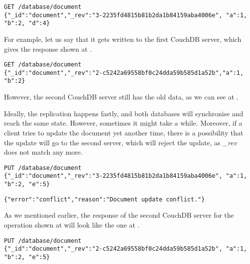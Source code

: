 \begin{lstlisting}[caption={The result of requesting the \textit{document} from CouchDB-1.}, label={lst:rwork5}]
GET /database/document
{"_id":"document","_rev":"3-2235fd4815b81b2da1b84159aba4006e", "a":1, "b":2, "d":4}
\end{lstlisting}

For example, let us say that it gets written to the first CouchDB server, which gives the response shown at .

\begin{lstlisting}[caption={The result of requesting the \textit{document} from CouchDB-2.}, label={lst:rwork6}]
GET /database/document
{"_id":"document","_rev":"2-c5242a69558bf0c24dda59b585d1a52b","a":1, "b":2}
\end{lstlisting}

However, the second CouchDB server still has the old data, as we can see at .

Ideally, the replication happens fastly, and both databases will synchronise and reach the same state. However, sometimes it might take a while. Moreover, if a client tries to update the document yet another time, there is a possibility that the update will go to the second server, which will reject the update, as \textit{\_rev} does not match any more. 

\begin{lstlisting}[caption={Updating the value of item \textit{document} by adding element \textit{e} and removing previously added element \textit{d}}, label={lst:rwork7}]
PUT /database/document
{"_id":"document","_rev":"3-2235fd4815b81b2da1b84159aba4006e", "a":1, "b":2, "e":5}
\end{lstlisting}

\begin{lstlisting}[caption={The demonstration of a conflict situation happening, when the \textit{\_rev} of sent operation and the one at the server do not match.}, label={lst:rwork8}]
{"error":"conflict","reason":"Document update conflict."}
\end{lstlisting}

As we mentioned earlier, the response of the second CouchDB server for the operation shown at  will look like the one at .

\begin{lstlisting}[caption={Updating the value of item \textit{document} by adding element \textit{e} and removing previously added element \textit{d} after receiving the new \textit{\_rev} from the second CouchDB server.}, label={lst:rwork9}]
PUT /database/document
{"_id":"document","_rev":"2-c5242a69558bf0c24dda59b585d1a52b", "a":1, "b":2, "e":5}
\end{lstlisting}

